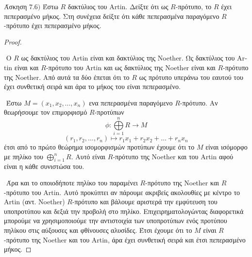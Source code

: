 \documentclass[oneside,a4paper]{article}
\newcommand {\tl}{\textlatin}
\begin{document}
\noindent Άσκηση $7.6)$
\quad Έστω $R$ δακτύλιος του \tl{Artin}. Δείξτε ότι ως $R$-πρότυπο, το $R$ έχει πεπερασμένο μήκος. Στη συνέχεια δείξτε ότι κάθε πεπερασμένα παραγόμενο $R$-πρότυπο έχει πεπερασμένο μήκος.
\vspace*{1cm}
\begin{proof} $ $

	$ $\newline
	Ο $R$ ως δακτύλιος του \tl{Artin} είναι και δακτύλιος της \tl{Noether}. Ως δακτύλιος του \tl{Artin} είναι και $R$-πρότυπο του \tl{Artin} και ως δακτύλιος της \tl{Noether} είναι και $R$-πρότυπο της \tl{Noether}. Από αυτά τα δύο έπεται ότι το $R$ ως πρότυπο υπεράνω του εαυτού του έχει συνθετική σειρά και άρα το μήκος του είναι πεπερασμένο.

	$ $\newline
	Έστω $M = (x_1, x_2, \ldots, x_n)$ ενα πεπερασμένα παραγόμενο $R$-πρότυπο. Αν θεωρήσουμε τον επιμορφισμό $R$-προτύπων 
	$$\phi : \bigoplus\limits_{i=1}^n R \longrightarrow M $$
	$$(r_1 , r_2, \ldots, r_n) \longmapsto r_1 x_1 + r_2 x_2 + \ldots + r_n x_n$$ έτσι από το πρώτο θεώρημα ισομορφισμών προτύπων έχουμε ότι το $M$ είναι ισόμορφο με πηλίκο του $\bigoplus\limits_{i=1}^n R$. Αυτό είναι $R$-πρότυπο της \tl{Noether} και του \tl{Artin} αφού είναι η κάθε συνιστώσα του. 
	
	$ $\newline
	Άρα και το οποιοδήποτε πηλίκο του παραμένει $R$-πρότυπο της \tl{Noether} και $R$-πρότυπο του \tl{Artin}. Αυτό προκύπτει αν πάρουμε ακριβείς ακολουθίες με κέντρο το \tl{Artin} (αντ. \tl{Noether}) $R$-πρότυπο και βάλουμε αριστερά την εμφύτευση του υποπροτύπου και δεξιά την προβολή στο πηλίκο. Επιχειρηματολογώντας διαφορετικά μπορούμε να χρησιμοποιούμε την αντιστοιχία των υποπροτύπων ενός προτύπου πηλίκου στις αύξουσες και φθίνουσες αλυσίδες. Έτσι έχουμε ότι το $M$ είναι $R$-πρότυπο της \tl{Noether} και του \tl{Artin}, άρα έχει συνθετική σειρά και έτσι πεπερασμένο μήκος.
\end{proof}
\pagebreak
\end{document}

